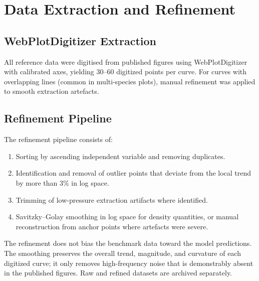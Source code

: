 \documentclass[11pt,a4paper]{report}
\begin{document}
\appendix

\chapter{Data Extraction and Refinement}
\label{app:data}

\section{WebPlotDigitizer Extraction}
\label{sec:app_wpd}

All reference data were digitised from published figures using WebPlotDigitizer with calibrated axes, yielding 30--60 digitized points per curve.  For curves with overlapping lines (common in multi-species plots), manual refinement was applied to smooth extraction artefacts.

\section{Refinement Pipeline}
\label{sec:app_refinement}

The refinement pipeline consists of:
\begin{enumerate}[nosep]
\item Sorting by ascending independent variable and removing duplicates.
\item Identification and removal of outlier points that deviate from the local trend by more than 3\% in log space.
\item Trimming of low-pressure extraction artifacts where identified.
\item Savitzky--Golay smoothing in log space for density quantities, or manual reconstruction from anchor points where artefacts were severe.
\end{enumerate}

The refinement does not bias the benchmark data toward the model predictions.  The smoothing preserves the overall trend, magnitude, and curvature of each digitized curve; it only removes high-frequency noise that is demonstrably absent in the published figures.  Raw and refined datasets are archived separately.
\end{document}
